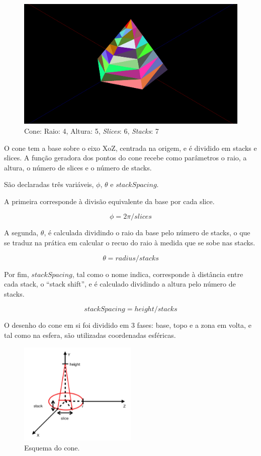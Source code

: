\documentclass[a4paper]{article}
\begin{document}
\begin{figure}[H]
    \centering
    \includegraphics[width=\textwidth]{cone.png}
    \caption{Cone: Raio: 4, Altura: 5, \textit{Slices}: 6, \textit{Stacks}: 7}
\end{figure}

O cone tem a base sobre o eixo XoZ, centrada na origem, e é dividido em stacks e slices. A função geradora dos pontos do cone recebe como parâmetros o raio, a altura, o número de slices e o número de stacks.

São declaradas três variáveis, $\phi$, $\theta$ e $stackSpacing$.

A primeira corresponde à divisão equivalente da base por cada slice.

\[\phi = 2 \pi / slices\]

A segunda, $\theta$, é calculada dividindo o raio da base pelo número de stacks, o que se traduz na prática em calcular o recuo do raio à medida que se sobe nas stacks.

\[\theta = radius / stacks\]

Por fim, $stackSpacing$, tal como o nome indica, corresponde à distância entre cada stack, o ``stack shift'', e é calculado dividindo a altura pelo número de stacks.

\[stackSpacing = height / stacks\]

O desenho do cone em si foi dividido em 3 fases: base, topo e a zona em volta, e tal como na esfera, são utilizadas coordenadas esféricas.

\begin{figure}[H]
    \centering
    \includegraphics[width=0.5\textwidth]{coneEsquema.PNG}
    \caption{Esquema do cone.}
\end{figure}
\end{document}
